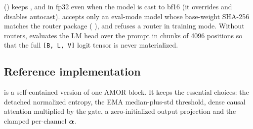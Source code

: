\begin{implnote}[title={In the code: routers and chunked gates}]
 () keeps ,
 and  in fp32 even when the model is cast to bf16 (it overrides  and
disables autocast).  accepts only an eval-mode model whose base-weight SHA-256 matches
the router package ( ), and  refuses a router in
training mode. Without routers,  evaluates the LM head over the prompt in chunks of
4096 positions so that the full \texttt{[B, L, V]} logit tensor is never materialized.
\end{implnote}

\subsection{Reference implementation}

 is a self-contained version of one AMOR block. It keeps the essential
choices: the detached normalized entropy, the EMA median-plus-std threshold, dense causal attention
multiplied by the gate, a zero-initialized output projection and the clamped per-channel $\bm{\alpha}$.


